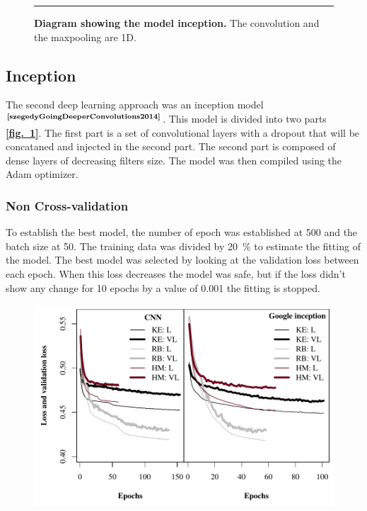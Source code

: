 \documentclass[12pt, oneside, a4paper]{report}
\newcommand{\fref}[1]{\hyperref[#1]{\textbf{[fig.~\ref*{#1}]}}}
\newcommand{\p}[1]{$^\text{#1}$}
\newcommand{\Cite}[1]{\p{\textbf{\cite{#1}}}}
\begin{document}
\begin{multicols}{2}
\begin{figure}[!tb]
    \small
    \vspace{0.5ex}
    
    \hrule height 1pt
    
    \vspace{1ex}
    
    \caption{
        \textbf{Diagram showing the model inception.} The convolution and the maxpooling are 1D.
        \label{f:inception}}
\end{figure}

\subsection{Inception}
The second deep learning approach was an inception model\Cite{szegedyGoingDeeperConvolutions2014}. This model is divided into two parts \fref{f:inception}. The first part  is a set of convolutional layers with a dropout that will be concataned and injected in the second part. The second part is composed of dense layers of decreasing filters size. The model was then compiled using the Adam optimizer.


\subsubsection{Non Cross-validation}
To establish the best model, the number of epoch was established at 500 and the batch size at 50. The training data was divided by 20~\% to estimate the fitting of the model.
The best model was selected by looking at the validation loss between each epoch. When this loss decreases the model was safe, but if the loss didn't show any change for 10 epochs by a value of 0.001 the fitting is stopped.

\begin{figure}[!tb]
    \centering
    \includegraphics[width=\textwidth]{figure/loss_function.pdf}
        

\end{figure}
\end{multicols}
\end{document}
